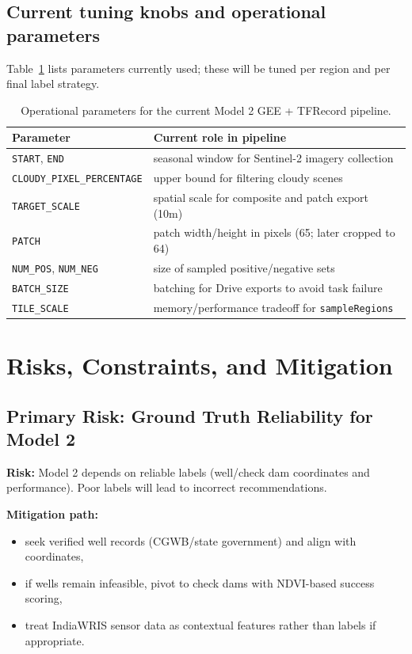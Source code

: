 \documentclass[12pt,a4paper]{report}
\begin{document}
\section{Current tuning knobs and operational parameters}
Table~\ref{tab:opsparams} lists parameters currently used; these will be tuned per region and per final label strategy.

\begin{table}[H]
\centering
\begin{tabular}{p{} p{}}
\toprule
\textbf{Parameter} & \textbf{Current role in pipeline} \\
\midrule
\texttt{START}, \texttt{END} & seasonal window for Sentinel-2 imagery collection \\
\texttt{CLOUDY\_PIXEL\_PERCENTAGE} & upper bound for filtering cloudy scenes \\
\texttt{TARGET\_SCALE} & spatial scale for composite and patch export (10m) \\
\texttt{PATCH} & patch width/height in pixels (65; later cropped to 64) \\
\texttt{NUM\_POS}, \texttt{NUM\_NEG} & size of sampled positive/negative sets \\
\texttt{BATCH\_SIZE} & batching for Drive exports to avoid task failure \\
\texttt{TILE\_SCALE} & memory/performance tradeoff for \texttt{sampleRegions} \\
\bottomrule
\end{tabular}
\caption{Operational parameters for the current Model 2 GEE + TFRecord pipeline.}
\label{tab:opsparams}
\end{table}

\chapter{Risks, Constraints, and Mitigation}
\section{Primary Risk: Ground Truth Reliability for Model 2}
\textbf{Risk:} Model 2 depends on reliable labels (well/check dam coordinates and performance). Poor labels will lead to incorrect recommendations.

\textbf{Mitigation path:}
\begin{itemize}
  \item seek verified well records (CGWB/state government) and align with coordinates,
  \item if wells remain infeasible, pivot to check dams with NDVI-based success scoring,
  \item treat IndiaWRIS sensor data as contextual features rather than labels if appropriate.
\end{itemize}
\end{document}
